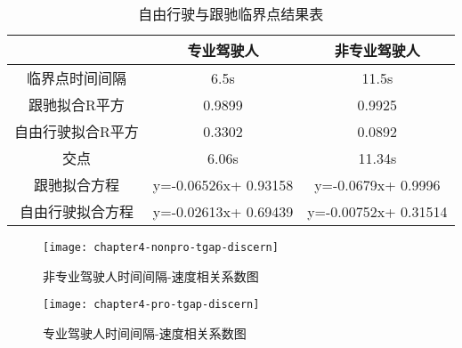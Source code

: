 \begin{table}[htbp]
  \centering
  \caption{自由行驶与跟驰临界点结果表}
    \begin{tabular}{ccc}
    \addlinespace
    \toprule
          & 专业驾驶人 & 非专业驾驶人 \\
    \midrule
    临界点时间间隔 & 6.5s  & 11.5s \\
    跟驰拟合R平方 & 0.9899 & 0.9925 \\
    自由行驶拟合R平方 & 0.3302 & 0.0892 \\
    交点 & 6.06s & 11.34s \\
    跟驰拟合方程 & y=-0.06526x+ 0.93158 & y=-0.0679x+ 0.9996 \\
    自由行驶拟合方程 & y=-0.02613x+ 0.69439 & y=-0.00752x+ 0.31514 \\
    \bottomrule
    \end{tabular}%
\label{tab-free-discern}
\end{table}%

\begin{figure}[htbp]
\begin{minipage}[t]{0.48\linewidth}
\centering
\texttt{[image: chapter4-nonpro-tgap-discern]}
\caption{非专业驾驶人时间间隔-速度相关系数图}
\label{nonpro-tgap-discern}
\end{minipage}%
\hspace*{0.04\linewidth}
\begin{minipage}[t]{0.48\linewidth}
\centering
\texttt{[image: chapter4-pro-tgap-discern]}
\caption{专业驾驶人时间间隔-速度相关系数图}
\label{pro-tgap-discern}
\end{minipage}
\end{figure}







